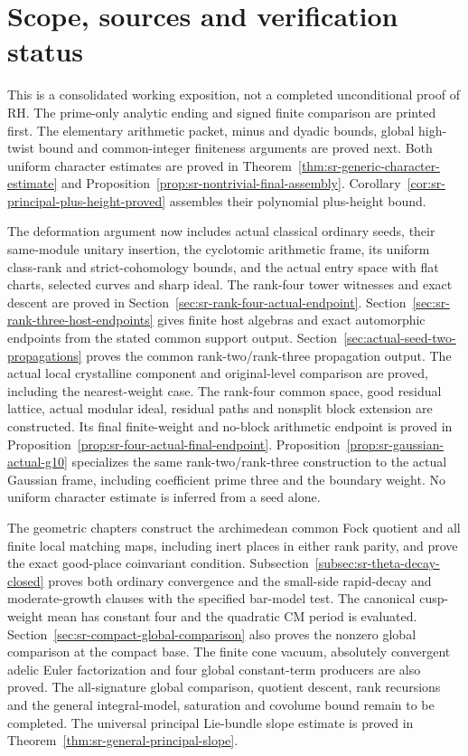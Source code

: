 \section*{Scope, sources and verification status}
This is a consolidated working exposition, not a completed unconditional
proof of RH. The prime-only analytic ending and signed finite comparison
are printed first. The elementary arithmetic packet, minus and dyadic
bounds, global high-twist bound and common-integer finiteness arguments
are proved next. Both uniform character estimates are proved in
Theorem~\ref{thm:sr-generic-character-estimate} and
Proposition~\ref{prop:sr-nontrivial-final-assembly}.
Corollary~\ref{cor:sr-principal-plus-height-proved} assembles
their polynomial plus-height bound.

The deformation argument now includes actual classical ordinary seeds,
their same-module unitary insertion, the cyclotomic arithmetic frame,
its uniform class-rank and strict-cohomology bounds, and the actual entry
space with flat charts, selected curves and sharp ideal.
The rank-four tower witnesses and exact descent are proved in
Section~\ref{sec:sr-rank-four-actual-endpoint}.
Section~\ref{sec:sr-rank-three-host-endpoints} gives finite host algebras
and exact automorphic endpoints from the stated common support output.
Section~\ref{sec:actual-seed-two-propagations} proves the common
rank-two/rank-three propagation output. The actual local crystalline
component and original-level comparison
are proved, including the nearest-weight case. The rank-four common space, good residual lattice, actual modular
ideal, residual paths and nonsplit block extension are constructed.
Its final finite-weight and no-block arithmetic endpoint is proved
in Proposition~\ref{prop:sr-four-actual-final-endpoint}.
Proposition~\ref{prop:sr-gaussian-actual-g10} specializes the
same rank-two/rank-three construction to the actual Gaussian
frame, including coefficient prime three and the boundary weight. No uniform character estimate is inferred
from a seed alone.

The geometric chapters construct the archimedean common Fock quotient
and all finite local matching maps,
including inert places in either rank parity, and prove the exact
good-place coinvariant condition.
Subsection~\ref{subsec:sr-theta-decay-closed} proves both ordinary
convergence and the small-side rapid-decay and moderate-growth clauses
with the specified bar-model test.
The canonical cusp-weight mean has constant four and the quadratic
CM period is evaluated. Section~\ref{sec:sr-compact-global-comparison}
also proves the nonzero global comparison at the compact base.
The finite cone vacuum, absolutely convergent adelic Euler
factorization and four global constant-term producers are also proved.
The all-signature global comparison, quotient descent, rank recursions
and the general integral-model, saturation and covolume bound
remain to be completed. The universal principal Lie-bundle
slope estimate is proved in
Theorem~\ref{thm:sr-general-principal-slope}.

